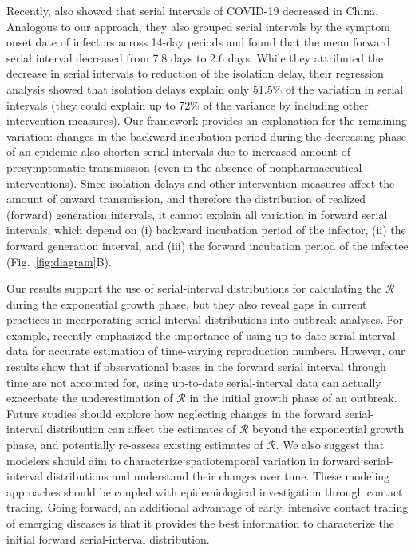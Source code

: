 \documentclass[12pt]{article}
\newcommand{\fref}[1]{Fig.~\ref{fig:#1}}
\newcommand{\RR}{\ensuremath{{\mathcal R}}\xspace}
\begin{document}
Recently, \cite{ali2020serial} also showed that serial intervals of COVID-19 decreased in China. Analogous to our approach, they also grouped serial intervals by the symptom onset date of infectors across 14-day periods and found that the mean forward serial interval decreased from 7.8 days to 2.6 days.
While they attributed the decrease in serial intervals to reduction of the isolation delay, their regression analysis showed that isolation delays explain only 51.5\% of the variation in serial intervals (they could explain up to 72\% of the variance by including other intervention measures).
Our framework provides an explanation for the remaining variation: changes in the backward incubation period during the decreasing phase of an epidemic also shorten serial intervals due to increased amount of presymptomatic transmission (even in the absence of nonpharmaceutical interventions).
Since isolation delays and other intervention measures affect the amount of onward transmission, and therefore the distribution of realized (forward) generation intervals, it cannot explain all variation in forward serial intervals, which depend on (i) backward incubation period of the infector, (ii) the forward generation interval, and (iii) the forward incubation period of the infectee (\fref{diagram}B).

Our results support the use of serial-interval distributions for calculating the \RR during the exponential growth phase,  
but they also reveal gaps in current practices in incorporating serial-interval distributions into outbreak analyses.
For example, \cite{thompson2019improved} recently emphasized the importance of using up-to-date serial-interval data for accurate estimation of time-varying reproduction numbers.
However, our results show that if observational biases in the forward serial interval through time are not accounted for, using up-to-date serial-interval data can actually exacerbate the underestimation of \RR in the initial growth phase of an outbreak.
Future studies should explore how neglecting changes in the forward serial-interval distribution can affect the estimates of \RR beyond the exponential growth phase, and potentially re-assess existing estimates of \RR.
We also suggest that modelers should aim to characterize spatiotemporal variation in forward serial-interval distributions and understand their changes over time.
These modeling approaches should be coupled with epidemiological investigation through contact tracing. 
Going forward, an additional advantage of early, intensive contact tracing of emerging diseases is that it provides the best information to characterize the initial forward serial-interval distribution.
\end{document}
